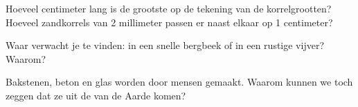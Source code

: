 \begin{exercise}[$\star\star$]\label{exo:g3:stones-pebbles-sand:8}
Hoeveel centimeter lang is de grootste  op de tekening van de
korrelgrootten? Hoeveel zandkorrels van 2 millimeter passen er naast elkaar
op 1 centimeter?
\end{exercise}

\begin{exercise}[$\star\star$]\label{exo:g3:stones-pebbles-sand:9}
Waar verwacht je  te vinden: in een snelle bergbeek of in een rustige
vijver? Waarom?
\end{exercise}

\begin{exercise}[$\star\star$]\label{exo:g3:stones-pebbles-sand:10}
Bakstenen, beton en glas worden door mensen gemaakt. Waarom kunnen we toch
zeggen dat ze uit de  van de Aarde komen?
\end{exercise}

